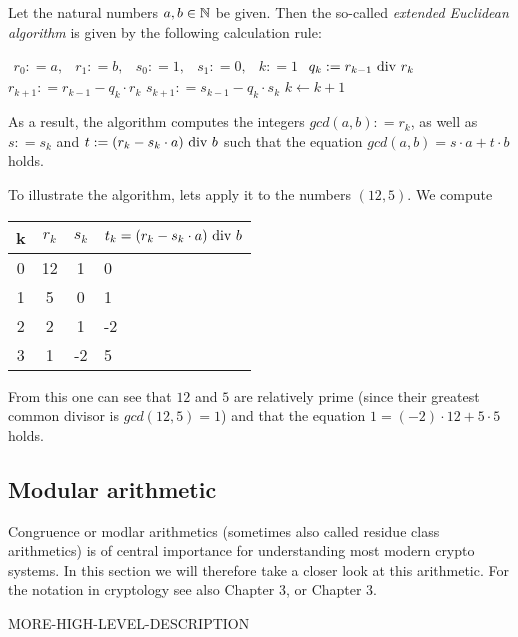 \begin{definition}
\label{theorem: ext_Euclid}
Let the natural numbers $ a, b \in \mathbb{N} $ be given. Then the so-called \textit{extended Euclidean algorithm} is given by the following calculation rule:
\begin{algorithmic}
\State $ \begin{array}{ccccc}
r_0: = a, & r_1: = b, & s_0: = 1, & s_1: = 0, & k: = 1
\end{array} $
\State $ q_k: = r_{k-1} \text{ div } r_k $
\State $ r_{k + 1}: = r_{k-1} -q_k \cdot r_k $
\State $ s_{k + 1}: = s_{k-1} -q_k \cdot s_k $
\State $ k \gets k + 1 $
\EndWhile
\end{algorithmic}
As a result, the algorithm computes the integers $ gcd (a, b): = r_k $, as well as $ s: = s_k $ and $ t: = (r_k-s_k \cdot a) \text{ div } b $ such that the equation
$ gcd (a, b) = s \cdot a + t \cdot b $ holds.
\end{definition}
\begin{example} To illustrate the algorithm, lets apply it to the numbers $ (12,5) $. We compute
\begin{center}
  \begin{tabular}{c | c c l}
    k & $ r_k $ & $ s_k $ & $ t_k = (r_k-s_k \cdot a) \text{ div } b $ \\\hline
    0 & 12 & 1 & 0 \\
    1 & 5 & 0 & 1 \\
    2 & 2 & 1 & -2 \\
    3 & 1 & -2 & 5 \\
  \end{tabular}
\end{center}
From this one can see that $ 12 $ and $ 5 $ are relatively prime (since their greatest common divisor is $ gcd (12, 5) = 1 $) and that the equation $ 1 = (-2) \cdot 12 + 5 \cdot 5 $ holds.
\end{example}

\subsection{Modular arithmetic}
Congruence or modlar arithmetics (sometimes also called residue class arithmetics) is of central importance for understanding most modern crypto systems. In this section we will therefore take a closer look at this arithmetic. For the notation in cryptology see also \cite{JB} Chapter 3, or \cite{AL} Chapter 3.

MORE-HIGH-LEVEL-DESCRIPTION

